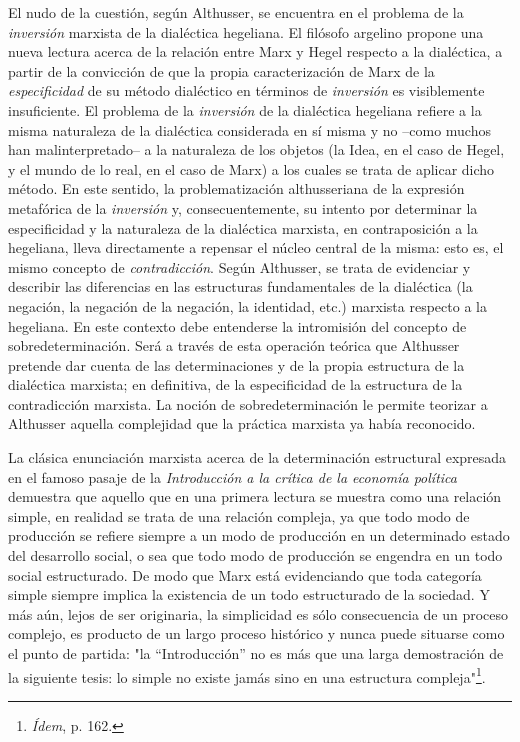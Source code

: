 \documentclass{book}
\begin{document}
El nudo de la cuestión, según Althusser, se encuentra en el problema de
la \emph{inversión} marxista de la dialéctica hegeliana. El filósofo
argelino propone una nueva lectura acerca de la relación entre Marx y
Hegel respecto a la dialéctica, a partir de la convicción de que la
propia caracterización de Marx de la \emph{especificidad} de su método
dialéctico en términos de \emph{inversión} es visiblemente insuficiente.
El problema de la \emph{inversión} de la dialéctica hegeliana refiere a
la misma naturaleza de la dialéctica considerada en sí misma y no --como
muchos han malinterpretado-- a la naturaleza de los objetos (la Idea, en
el caso de Hegel, y el mundo de lo real, en el caso de Marx) a los
cuales se trata de aplicar dicho método. En este sentido, la
problematización althusseriana de la expresión metafórica de la
\emph{inversión} y, consecuentemente, su intento por determinar la
especificidad y la naturaleza de la dialéctica marxista, en
contraposición a la hegeliana, lleva directamente a repensar el núcleo
central de la misma: esto es, el mismo concepto de \emph{contradicción}.
Según Althusser, se trata de evidenciar y describir las diferencias en
las estructuras fundamentales de la dialéctica (la negación, la negación
de la negación, la identidad, etc.) marxista respecto a la hegeliana. En
este contexto debe entenderse la intromisión del concepto de
sobredeterminación. Será a través de esta operación teórica que
Althusser pretende dar cuenta de las determinaciones y de la propia
estructura de la dialéctica marxista; en definitiva, de la especificidad
de la estructura de la contradicción marxista. La noción de
sobredeterminación le permite teorizar a Althusser aquella complejidad
que la práctica marxista ya había reconocido.

La clásica enunciación marxista acerca de la determinación estructural
expresada en el famoso pasaje de la \emph{Introducción a la crítica de
la economía política} demuestra que aquello que en una primera lectura
se muestra como una relación simple, en realidad se trata de una
relación compleja, ya que todo modo de producción se refiere siempre a
un modo de producción en un determinado estado del desarrollo social, o
sea que todo modo de producción se engendra en un todo social
estructurado. De modo que Marx está evidenciando que toda categoría
simple siempre implica la existencia de un todo estructurado de la
sociedad. Y más aún, lejos de ser originaria, la simplicidad es sólo
consecuencia de un proceso complejo, es producto de un largo proceso
histórico y nunca puede situarse como el punto de partida: "la
``Introducción'' no es más que una larga demostración de la siguiente
tesis: lo simple no existe jamás sino en una estructura
compleja"\footnote{\emph{Ídem}, p. 162.}.
\end{document}
